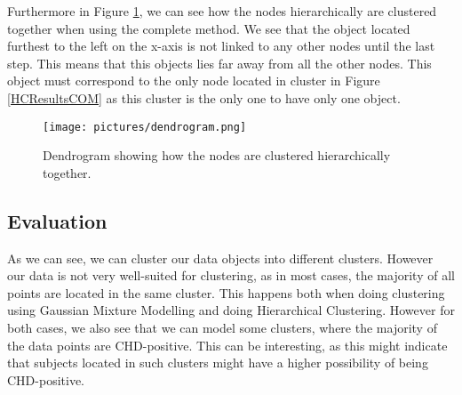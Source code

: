 Furthermore in Figure \ref{dendrogram}, we can see how the nodes hierarchically are clustered together when using the complete method. We see that the object located furthest to the left on the x-axis is not linked to any other nodes until the last step. This means that this objects lies far away from all the other nodes. This object must correspond to the only node located in cluster \HCCOMS{} in Figure \ref{HCResultsCOM} as this cluster is the only one to have only one object.

\begin{figure}[H]
\texttt{[image: pictures/dendrogram.png]}
\caption{\footnotesize Dendrogram showing how the nodes are clustered hierarchically together.}
\label{dendrogram}
\end{figure}


\subsection{Evaluation}

As we can see, we can cluster our data objects into different clusters. However our data is not very well-suited for clustering, as in most cases, the majority of all points are located in the same cluster. This happens both when doing clustering using Gaussian Mixture Modelling and doing Hierarchical Clustering. However for both cases, we also see that we can model some clusters, where the majority of the data points are CHD-positive. This can be interesting, as this might indicate that subjects located in such clusters might have a higher possibility of being CHD-positive.